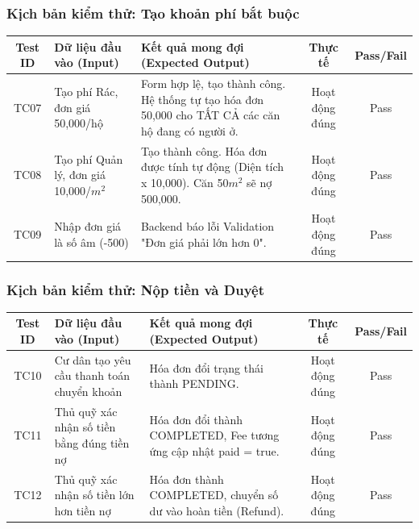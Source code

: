 \documentclass[12pt,a4paper]{article}
\begin{document}
\subsubsection{Kịch bản kiểm thử: Tạo khoản phí bắt buộc}
\begin{table}[H]
    \centering
    \begin{tabularx}{\textwidth}{|c|L{4cm}|X|c|c|}
    \hline
    \textbf{Test ID} & \textbf{Dữ liệu đầu vào (Input)} & \textbf{Kết quả mong đợi (Expected Output)} & \textbf{Thực tế} & \textbf{Pass/Fail} \\
    \hline
    TC07 & Tạo phí Rác, đơn giá 50,000/hộ & Form hợp lệ, tạo thành công. Hệ thống tự tạo hóa đơn 50,000 cho TẤT CẢ các căn hộ đang có người ở. & Hoạt động đúng & Pass \\
    \hline
    TC08 & Tạo phí Quản lý, đơn giá 10,000/$m^2$ & Tạo thành công. Hóa đơn được tính tự động (Diện tích x 10,000). Căn 50$m^2$ sẽ nợ 500,000. & Hoạt động đúng & Pass \\
    \hline
    TC09 & Nhập đơn giá là số âm (-500) & Backend báo lỗi Validation "Đơn giá phải lớn hơn 0". & Hoạt động đúng & Pass \\
    \hline
    \end{tabularx}
\end{table}

\subsubsection{Kịch bản kiểm thử: Nộp tiền và Duyệt}
\begin{table}[H]
    \centering
    \begin{tabularx}{\textwidth}{|c|L{4cm}|X|c|c|}
    \hline
    \textbf{Test ID} & \textbf{Dữ liệu đầu vào (Input)} & \textbf{Kết quả mong đợi (Expected Output)} & \textbf{Thực tế} & \textbf{Pass/Fail} \\
    \hline
    TC10 & Cư dân tạo yêu cầu thanh toán chuyển khoản & Hóa đơn đổi trạng thái thành PENDING. & Hoạt động đúng & Pass \\
    \hline
    TC11 & Thủ quỹ xác nhận số tiền bằng đúng tiền nợ & Hóa đơn đổi thành COMPLETED, Fee tương ứng cập nhật paid = true. & Hoạt động đúng & Pass \\
    \hline
    TC12 & Thủ quỹ xác nhận số tiền lớn hơn tiền nợ & Hóa đơn thành COMPLETED, chuyển số dư vào hoàn tiền (Refund). & Hoạt động đúng & Pass \\
    \hline
    \end{tabularx}
\end{table}
\end{document}
